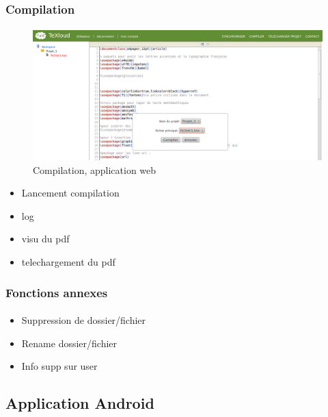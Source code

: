 \documentclass[a4paper,12pt]{article}
\begin{document}
\subsubsection{Compilation}
\paragraph*{}


\begin{figure}[!ht]
\begin{center}
  \includegraphics[width=1\textwidth]{./images/screenshot/Compiler.png}
\end{center}
  \caption{Compilation, application web}
  \label{compilation}
\end{figure}

\begin{itemize}
 \item Lancement compilation
 \item log
 \item visu du pdf
 \item telechargement du pdf
\end{itemize}


\subsubsection{Fonctions annexes}
\paragraph*{}
\begin{itemize}
 \item Suppression de dossier/fichier
 \item Rename dossier/fichier
 \item Info supp sur user
\end{itemize}

\subsection{Application Android}
\end{document}
